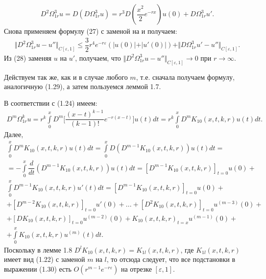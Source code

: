 \begin{equation}
\begin{array}{c}

D^2\Omega_{1r}^3u = D(D\Omega_{1r}^3u) = r^3D(\dfrac{x^2}{2}e^{-rx})u(0) + D\Omega_{1r}^3u'.

\end{array}
\end{equation}
Снова применяем формулу (27) с заменой  на  и получаем:
\begin{equation}
\begin{array}{c}
\nonumber

\Vert D^2\Omega_{1r}^3u - u'' \Vert_{C[\varepsilon ,1]} \leq \dfrac{3}{2}r^4e^{-r\varepsilon}(\vert u(0)\vert + \vert u'(0) \vert) + \Vert D\Omega_{1r}^3u' - u'' \Vert_{C[\varepsilon ,1]}.

\end{array}
\end{equation}
Из (28) заменяя $ u $ на $ u' $, получаем, что $ \Vert D^2\Omega_{1r}^3u - u'' \Vert_{C[\varepsilon ,1]} \rightarrow 0 $ при $ r \rightarrow \infty $.

Действуем так же, как и в случае любого $ m $, т.е. сначала получаем формулу, аналогичную (1.29), а затем пользуемся леммой 1.7.

В соответствии с (1.24) имеем:
\begin{equation}
\begin{array}{c}
\nonumber

D^m\Omega_{1r}^ku = r^k\int\limits_0^x D^m \biggl[ \dfrac{(x-t)^{k-1}}{(k-1)!}e^{-r(x-t)} \biggr]u(t)dt = r^k\int\limits_0^x D^mK_{10}(x,t,k,r)u(t)dt.

\end{array}
\end{equation}
Далее,
\begin{equation}
\begin{array}{c}

\int\limits_0^x D^mK_{10}(x,t,k,r)u(t)dt = \int\limits_0^x D(D^{m-1}K_{10}(x,t,k,r))u(t)dt = \\ 
= - \int\limits_0^x \dfrac{d}{dt}(D^{m-1}K_{10}(x,t,k,r))u(t)dt = [D^{m-1}K_{10}(x,t,k,r)]_{t=0}u(0) + \\ \int\limits_0^x D^{m-1}K_{10}(x,t,k,r)u'(t)dt = [D^{m-1}K_{10}(x,t,k,r)]_{t=0}u(0) + \\ + [D^{m-2}K_{10}(x,t,k,r)]_{t=0}u'(0) + ... + [D^2K_{10}(x,t,k,r)]_{t=0}u^{(m-3)}(0) + \\ + [DK_{10}(x,t,k,r)]_{t=0}u^{(m-2)}(0) + K_{10}(x,t,k,r)_{t=x}u^{(m-1)}(0) + \\ + \int\limits_0^x K_{10}(x,t,k,r)u^{(m)}(t)dt.

\end{array}
\end{equation}
Поскольку в лемме 1.8 $ D^lK_{10}(x,t,k,r) = K_{1l}(x,t,k,r) $, где $ K_{1l}(x,t,k,r) $ имеет вид (1.22) с заменой $ m $ на $ l $, то отсюда следует, что все подстановки в выражении (1.30) есть $ O(r^{m-1}e^{-r\varepsilon}) $ на отрезке $ [\varepsilon ,1] $.

